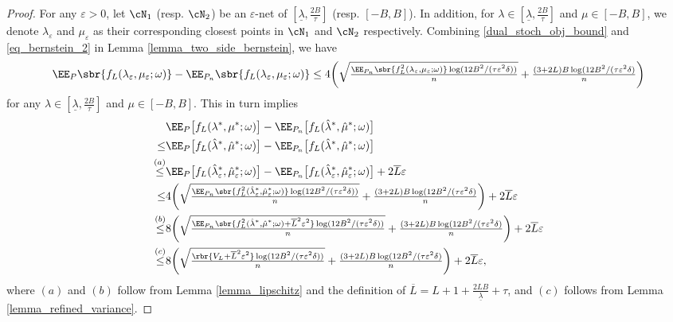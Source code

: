 \documentclass[9pt]{article} %
\numberwithin{equation}{section}
\renewcommand{\frac}[2]{\tfrac{#1}{#2}}
\begin{document}
\begin{proof}
For any $\varepsilon > 0$, let $\cN_1$ (resp. $\cN_2$) be an $\varepsilon$-net of $[\underline{\lambda}, \frac{2B}{\tau}]$ (resp. $[-B, B]$). 
In addition, for $\lambda \in  [\underline{\lambda}, \frac{2B}{\tau}]$ and $\mu \in [-B, B]$, we denote  
$\lambda_\varepsilon$ and $\mu_\varepsilon$ as their corresponding closest points in $\cN_1$ and $\cN_2$ respectively. 
Combining  \eqref{dual_stoch_obj_bound} and \eqref{eq_bernstein_2} in Lemma \ref{lemma_two_side_bernstein}, we have 
\begin{align*}
\EE_{P} \sbr{f_L({\lambda}_\varepsilon, {\mu}_\varepsilon; \omega) } -  \EE_{P_n} \sbr{f_L({\lambda}_\varepsilon, {\mu}_\varepsilon; \omega) }  
\leq 
4 \bigg({
\sqrt{\frac{  { \EE_{P_n} \sbr{f_L^2({\lambda}_\varepsilon, {\mu}_\varepsilon; \omega)}} \log(12 B^2/(\tau \varepsilon^2 \delta))}{n}} + \frac{(3 + 2L)B \log(12 B^2/(\tau \varepsilon^2 \delta)}{n} 
} \bigg)
\end{align*}
for any $\lambda \in  [\underline{\lambda}, \frac{2B}{\tau}]$ and $\mu \in [-B, B]$.
This in turn implies 
\begin{align}
& \EE_{P} \big[{f_L({\lambda}^*, {\mu}^*; \omega) }\big] -  \EE_{P_n} \big[{f_L(\hat{\lambda}^*, \hat{\mu}^*; \omega) } \big]\nonumber  \\
\leq & \EE_{P} \big[{f_L(\hat{\lambda}^*, \hat{\mu}^*; \omega) }\big] -  \EE_{P_n} \big[{f_L(\hat{\lambda}^*, \hat{\mu}^*; \omega) } \big]\nonumber  \\
 \overset{(a)}{\leq}   & 
\EE_{P} \big[ {f_L(\hat{\lambda}^*_\varepsilon, \hat{\mu}^*_\varepsilon; \omega) } \big] -  \EE_{P_n} \big[{f_L(\hat{\lambda}^*_\varepsilon, \hat{\mu}^*_\varepsilon; \omega) } \big] + 2 \overline{L} \varepsilon   \nonumber \\
\leq & 
4 \bigg({
\sqrt{\frac{  { \EE_{P_n} \sbr{f_L^2(\hat{\lambda}^*_\varepsilon, \hat{\mu}^*_\varepsilon; \omega)}} \log(12 B^2/(\tau \varepsilon^2 \delta))}{n}} + \frac{(3 + 2L)B \log(12 B^2/(\tau \varepsilon^2 \delta)}{n} 
} \bigg)
+ 2 \overline{L} \varepsilon   \nonumber  \\
\overset{(b)}{\leq} & 
8 \bigg({
\sqrt{\frac{  { \EE_{P_n} \sbr{f_L^2(\hat{\lambda}^*, \hat{\mu}^*; \omega) + \overline{L}^2 \varepsilon^2 }} \log(12 B^2/(\tau \varepsilon^2 \delta))}{n}} + \frac{(3 + 2L)B \log(12 B^2/(\tau \varepsilon^2 \delta)}{n} 
} \bigg)
+ 2 \overline{L} \varepsilon \nonumber \\
\overset{(c)}{\leq} & 
8 \bigg({
\sqrt{\frac{  {  \rbr{V_L + \overline{L}^2 \varepsilon^2 }} \log(12 B^2/(\tau \varepsilon^2 \delta))}{n}} + \frac{(3 + 2L)B \log(12 B^2/(\tau \varepsilon^2 \delta)}{n} 
} \bigg)
+ 2 \overline{L} \varepsilon, \label{ineq_row_diff_emp_improved}
\end{align}
where $(a)$ and $(b)$ follow from  Lemma \ref{lemma_lipschitz} and the definition of $\overline{L} =  {L+1 +  \frac{2LB}{\underline{\lambda}} + \tau}$,
and $(c)$ follows from Lemma \ref{lemma_refined_variance}.



\end{proof}
\end{document}
